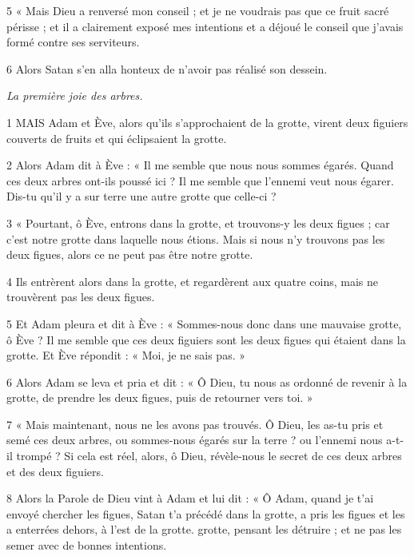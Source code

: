 \par 5 « Mais Dieu a renversé mon conseil ; et je ne voudrais pas que ce fruit sacré périsse ; et il a clairement exposé mes intentions et a déjoué le conseil que j'avais formé contre ses serviteurs.

\par 6 Alors Satan s'en alla honteux de n'avoir pas réalisé son dessein.


\par \textit{La première joie des arbres.}

\par 1 MAIS Adam et Ève, alors qu'ils s'approchaient de la grotte, virent deux figuiers couverts de fruits et qui éclipsaient la grotte.

\par 2 Alors Adam dit à Ève : « Il me semble que nous nous sommes égarés. Quand ces deux arbres ont-ils poussé ici ? Il me semble que l’ennemi veut nous égarer. Dis-tu qu’il y a sur terre une autre grotte que celle-ci ?

\par 3 « Pourtant, ô Ève, entrons dans la grotte, et trouvons-y les deux figues ; car c'est notre grotte dans laquelle nous étions. Mais si nous n’y trouvons pas les deux figues, alors ce ne peut pas être notre grotte.

\par 4 Ils entrèrent alors dans la grotte, et regardèrent aux quatre coins, mais ne trouvèrent pas les deux figues.

\par 5 Et Adam pleura et dit à Ève : « Sommes-nous donc dans une mauvaise grotte, ô Ève ? Il me semble que ces deux figuiers sont les deux figues qui étaient dans la grotte. Et Ève répondit : « Moi, je ne sais pas. »

\par 6 Alors Adam se leva et pria et dit : « Ô Dieu, tu nous as ordonné de revenir à la grotte, de prendre les deux figues, puis de retourner vers toi. »

\par 7 « Mais maintenant, nous ne les avons pas trouvés. Ô Dieu, les as-tu pris et semé ces deux arbres, ou sommes-nous égarés sur la terre ? ou l'ennemi nous a-t-il trompé ? Si cela est réel, alors, ô Dieu, révèle-nous le secret de ces deux arbres et des deux figuiers.

\par 8 Alors la Parole de Dieu vint à Adam et lui dit : « Ô Adam, quand je t'ai envoyé chercher les figues, Satan t'a précédé dans la grotte, a pris les figues et les a enterrées dehors, à l'est de la grotte. grotte, pensant les détruire ; et ne pas les semer avec de bonnes intentions.

